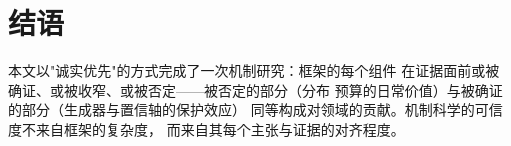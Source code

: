 \section*{结语}
本文以"诚实优先"的方式完成了一次机制研究：框架的每个组件
在证据面前或被确证、或被收窄、或被否定——被否定的部分（分布
预算的日常价值）与被确证的部分（生成器与置信轴的保护效应）
同等构成对领域的贡献。机制科学的可信度不来自框架的复杂度，
而来自其每个主张与证据的对齐程度。
